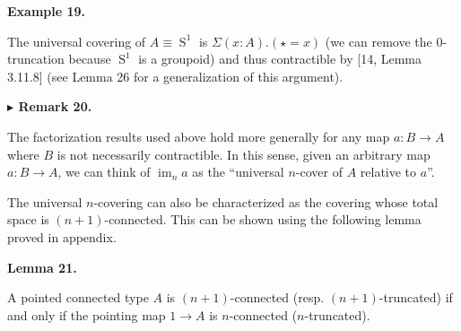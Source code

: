  
 
 
\par\medskip\noindent\textbf{Example 19.}\par
 
 
The universal covering of $A\equiv\operatorname{S}^{1}$ is $\Sigma(x:A).(\star=x)$ (we can remove the 0-truncation because $\operatorname{S}^{1}$ is a groupoid) and thus contractible by [14, Lemma 3.11.8] (see Lemma 26 for a generalization of this argument).\par
 
 
 
 
\par\medskip\noindent\textbf{$\blacktriangleright$ Remark 20.}\par
 
 
The factorization results used above hold more generally for any map $a:B\to A$ where $B$ is not necessarily contractible. In this sense, given an arbitrary map $a:B\to A$, we can think of $\operatorname{im}_{n}a$ as the “universal $n$-cover of $A$ relative to $a$”.\par
 
 
 
 
The universal $n$-covering can also be characterized as the covering whose total space is $(n{+}1)$-connected. This can be shown using the following lemma proved in appendix.\par
 
 
 
\par\medskip\noindent\textbf{Lemma 21.}\par
 
 
A pointed connected type $A$ is $(n{+}1)$-connected (resp. $(n{+}1)$-truncated) if and only if the pointing map $1\to A$ is $n$-connected ($n$-truncated).\par
 
